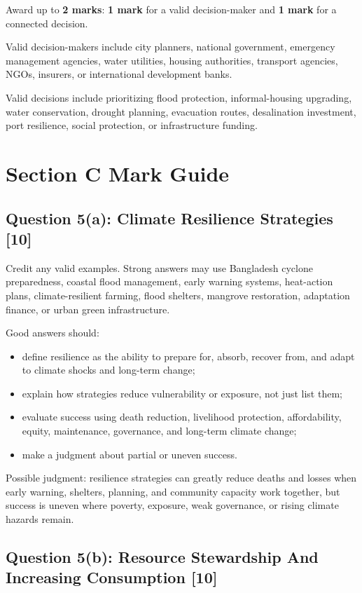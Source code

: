 \documentclass[11pt,a4paper]{article}
\newcommand{\score}[1]{\textcolor{AccentTeal}{\textbf{#1}}}
\begin{document}
Award up to \score{2 marks}: \score{1 mark} for a valid decision-maker and
\score{1 mark} for a connected decision.

Valid decision-makers include city planners, national government, emergency
management agencies, water utilities, housing authorities, transport agencies,
NGOs, insurers, or international development banks.

Valid decisions include prioritizing flood protection, informal-housing
upgrading, water conservation, drought planning, evacuation routes, desalination
investment, port resilience, social protection, or infrastructure funding.

\section{Section C Mark Guide}

\subsection{Question 5(a): Climate Resilience Strategies [10]}

Credit any valid examples. Strong answers may use Bangladesh cyclone
preparedness, coastal flood management, early warning systems, heat-action
plans, climate-resilient farming, flood shelters, mangrove restoration,
adaptation finance, or urban green infrastructure.

Good answers should:

\begin{itemize}
  \item define resilience as the ability to prepare for, absorb, recover from,
  and adapt to climate shocks and long-term change;
  \item explain how strategies reduce vulnerability or exposure, not just list
  them;
  \item evaluate success using death reduction, livelihood protection,
  affordability, equity, maintenance, governance, and long-term climate change;
  \item make a judgment about partial or uneven success.
\end{itemize}

Possible judgment: resilience strategies can greatly reduce deaths and losses
when early warning, shelters, planning, and community capacity work together,
but success is uneven where poverty, exposure, weak governance, or rising
climate hazards remain.

\subsection{Question 5(b): Resource Stewardship And Increasing Consumption [10]}
\end{document}
